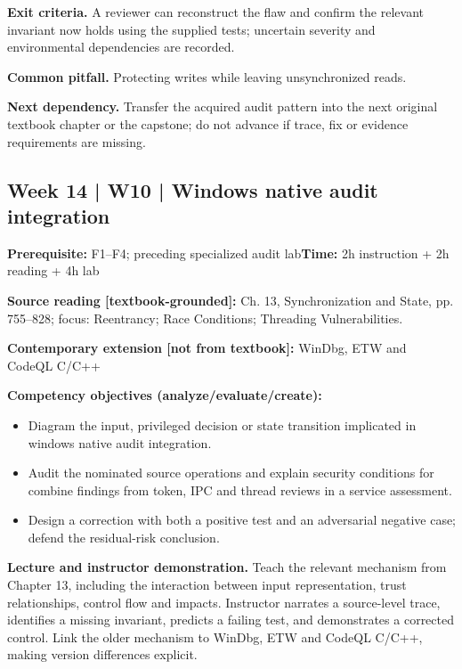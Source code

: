 \documentclass[10pt,letterpaper]{article}
\begin{document}
\textbf{Exit criteria.} A reviewer can reconstruct the flaw and confirm the relevant invariant now holds using the supplied tests; uncertain severity and environmental dependencies are recorded.

\textbf{Common pitfall.} Protecting writes while leaving unsynchronized reads.

\textbf{Next dependency.} Transfer the acquired audit pattern into the next original textbook chapter or the capstone; do not advance if trace, fix or evidence requirements are missing.

\subsection{Week 14 | W10 | Windows native audit integration}
\textbf{Prerequisite:} F1--F4; preceding specialized audit lab\hfill\textbf{Time:} 2h instruction + 2h reading + 4h lab

\textbf{Source reading [textbook-grounded]:} Ch. 13, Synchronization and State, pp. 755--828; focus: Reentrancy; Race Conditions; Threading Vulnerabilities.

\textbf{Contemporary extension [not from textbook]:} WinDbg, ETW and CodeQL C/C++

\textbf{Competency objectives (analyze/evaluate/create):}
\begin{itemize}[leftmargin=*,itemsep=2pt]
\item Diagram the input, privileged decision or state transition implicated in windows native audit integration.
\item Audit the nominated source operations and explain security conditions for combine findings from token, IPC and thread reviews in a service assessment.
\item Design a correction with both a positive test and an adversarial negative case; defend the residual-risk conclusion.
\end{itemize}
\textbf{Lecture and instructor demonstration.} Teach the relevant mechanism from Chapter 13, including the interaction between input representation, trust relationships, control flow and impacts. Instructor narrates a source-level trace, identifies a missing invariant, predicts a failing test, and demonstrates a corrected control. Link the older mechanism to WinDbg, ETW and CodeQL C/C++, making version differences explicit.
\end{document}
